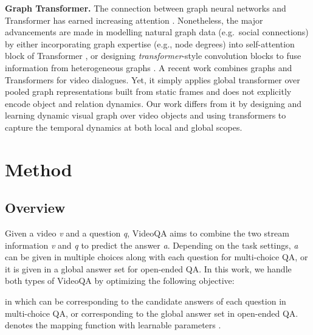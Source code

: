 \documentclass[runningheads]{llncs}
\newcommand{\eg}{e.g.}
\newcommand{\trans}{\emph{transformer}}
\begin{document}
\textbf{Graph Transformer.}
The connection between graph neural networks and Transformer has earned increasing attention \cite{wang2021tcl,ying2021transformers,yun2019graph}. Nonetheless, the major advancements are made in modelling natural graph data (\eg~social connections) by either incorporating graph expertise (\eg, node degrees) into self-attention block of Transformer \cite{ying2021transformers}, or designing \trans-style convolution blocks to fuse information from heterogeneous graphs \cite{yun2019graph}. A recent work \cite{geng2021dynamic} combines graphs and Transformers for video dialogues. Yet, it simply applies global transformer over pooled graph representations built from static frames and does not explicitly encode object and relation dynamics. Our work differs from it by designing and learning dynamic visual graph over video objects and using transformers to capture the temporal dynamics at both local and global scopes. 


\vspace{-0.2cm}
\section{Method}
\vspace{-0.2cm}
\subsection{Overview}
Given a video \textit{v} and a question \textit{q}, VideoQA aims to combine the two stream information \textit{v} and \textit{q} to predict the answer \textit{a}. Depending on the task settings, \textit{a} can be given in multiple choices along with each question for multi-choice QA, or it is given in a global answer set for open-ended QA. In this work, we handle both types of VideoQA by optimizing the following objective:

in which  can be  corresponding to the candidate answers of each question in multi-choice QA, or  corresponding to the global answer set in open-ended QA.  denotes the mapping function with learnable parameters .
\end{document}
